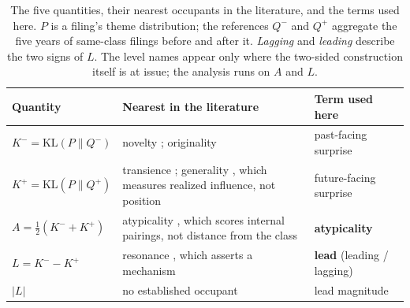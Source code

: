 \begin{table}[!htbp]\centering\small
\caption{The five quantities, their nearest occupants in the literature,
and the terms used here. $P$ is a filing's theme distribution; the
references $Q^{-}$ and $Q^{+}$ aggregate the five years of same-class
filings before and after it. \emph{Lagging} and \emph{leading} describe
the two signs of $L$. The level names appear only where the two-sided
construction itself is at issue; the analysis runs on $A$ and $L$.}
\label{tab:nomenclature}
\begin{tabular}{p{3.4cm}p{5.6cm}p{4.4cm}}
\toprule
Quantity & Nearest in the literature & Term used here \\
\midrule
$K^{-} = \mathrm{KL}(P \| Q^{-})$ & novelty \citep{Murdock2017, Barron2018}; originality \citep{HallJaffe2001} & past-facing surprise \\
$K^{+} = \mathrm{KL}(P \| Q^{+})$ & transience \citep{Murdock2017}; generality \citep{HallJaffe2001}, which measures realized influence, not position & future-facing surprise \\
$A = \tfrac{1}{2}(K^{-} + K^{+})$ & atypicality \citep{Uzzi2013}, which scores internal pairings, not distance from the class & \textbf{atypicality} \\
$L = K^{-} - K^{+}$ & resonance \citep{Barron2018}, which asserts a mechanism & \textbf{lead} (leading / lagging) \\
$|L|$ & no established occupant & lead magnitude \\
\bottomrule
\end{tabular}
\end{table}

